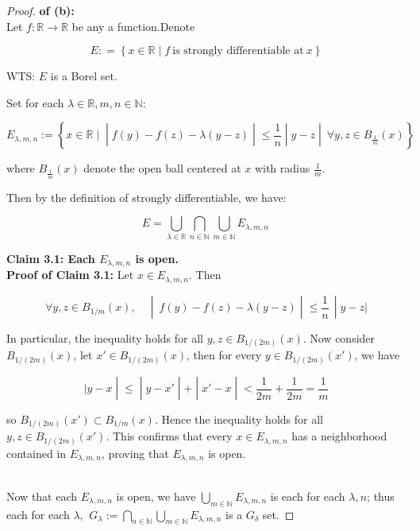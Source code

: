 \begin{proof}

\textbf{of (b):}\\
Let \(f:\mathbb{R}\rightarrow\mathbb{R}\) be any a function.Denote

\[E: = \left\{ {x \in \mathbb{R} \mid f\ \text{is strongly differentiable at}\ x} \right\}\]

WTS: \(E\) is a Borel set.

Set for each \(\lambda \in \mathbb{R},m,n \in \mathbb{N}\):

\[E_{\lambda,m,n} := \left\{ x \in \mathbb{R} \mid \middle| f(y) - f(z) - \lambda(y - z) \middle| \leq \frac{1}{n} \middle| y - z \middle| \ \forall y,z \in B_{\frac{1}{m}}(x) \right\}\]

where \(B_{\frac{1}{m}}(x)\) denote the open ball centered at \(x\) with radius \(\frac{1}{m}\).

Then by the definition of strongly differentiable, we have:

\[E = \bigcup\limits_{\lambda \in \mathbb{R}}\bigcap\limits_{n \in \mathbb{N}}\bigcup\limits_{m \in \mathbb{N}}E_{\lambda,m,n}\,\]

\textbf{Claim 3.1: Each \(E_{\lambda,m,n}\) is open.}\\
\textbf{Proof of Claim 3.1:} Let \(x \in E_{\lambda,m,n}\). Then

\[\left. \forall y,z \in B_{1/m}(x),\quad \middle| \ f(y) - f(z) - \lambda(y - z) \middle| \leq \frac{1}{n}\, \middle| y - z| \right.\]

In particular, the inequality holds for all \(y,z \in B_{1/(2m)}(x)\). Now consider \(B_{1/(2m)}(x)\), let \(x' \in B_{1/(2m)}(x)\), then for every \(y \in B_{1/(2m)}(x')\), we have

\[\left. |y - x \middle| \leq \middle| y - x' \middle| + \middle| x' - x \middle| < \frac{1}{2m} + \frac{1}{2m} = \frac{1}{m} \right.\]

so \(B_{1/(2m)}(x') \subset B_{1/m}(x)\). Hence the inequality holds for all \(y,z \in B_{1/(2m)}(x')\). This confirms that every \(x \in E_{\lambda,m,n}\) has a neighborhood contained in \(E_{\lambda,m,n}\), proving that \(E_{\lambda,m,n}\) is open.\\
\strut \\
Now that each \(E_{\lambda,m,n}\) is open, we have \(\bigcup_{m \in \mathbb{N}}E_{\lambda,m,n}\) is each for each \(\lambda,n\); thus each for each \(\lambda\), \(\ G_{\lambda} := \bigcap_{n \in \mathbb{N}}\bigcup_{m \in \mathbb{N}}E_{\lambda,m,n}\) is a \(G_{\delta}\) set.


\end{proof}

